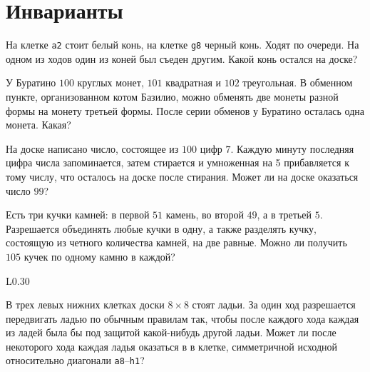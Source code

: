 
\section*{Инварианты}



\begin{problems}

\item
На клетке \texttt{a2} стоит белый конь, на клетке \texttt{g8} черный конь.
Ходят по очереди.
На одном из ходов один из коней был съеден другим.
Какой конь остался на доске?

\item
У Буратино $100$ круглых монет, $101$ квадратная и $102$ треугольная.
В обменном пункте, организованном котом Базилио, можно обменять две монеты
разной формы на монету третьей формы.
После серии обменов у Буратино осталась одна монета.
Какая?

\item
На доске написано число, состоящее из $100$ цифр $7$.
Каждую минуту последняя цифра числа запоминается, затем стирается и умноженная
на 5 прибавляется к тому числу, что осталось на доске после стирания.
Может ли на доске оказаться число $99$?

\item
Есть три кучки камней: в первой $51$ камень, во второй $49$, а в третьей $5$.
Разрешается объединять любые кучки в одну, а также разделять кучку, состоящую
из четного количества камней, на две равные.
Можно ли получить $105$ кучек по одному камню в каждой?

\end{problems}

\begin{wrapfigure}{L}{0.30\textwidth}\begin{center} %
\vspace{-2.5ex}
\hspace{0.05\textwidth}
\vspace{-2.5ex}
\end{center}\end{wrapfigure}

\problem
В трех левых нижних клетках доски $8 \times 8$ стоят ладьи.
За один ход разрешается передвигать ладью по обычным правилам так, чтобы после
каждого хода каждая из ладей была бы под защитой какой-нибудь другой ладьи.
Может ли после некоторого хода каждая ладья оказаться в в клетке, симметричной
исходной относительно диагонали \texttt{a8}--\texttt{h1}?

